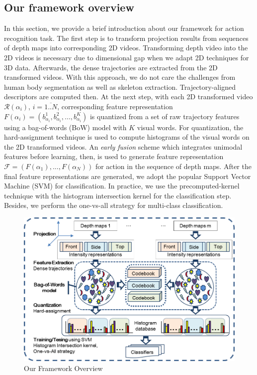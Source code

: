 \documentclass[review]{elsarticle}
\begin{document}
\subsection{Our framework overview}

In this section, we provide a brief introduction about our framework for action recognition task.
The first step is to transform projection results from sequences of depth maps into corresponding 2D videos.
Transforming depth video into the 2D videos is necessary due to dimensional gap when we adapt 2D techniques for 3D data.
Afterwards, the dense trajectories \cite{wang2011densetraj} are extracted from the 2D transformed videos.
With this approach, we do not care the challenges from human body segmentation as well as skeleton extraction.
Trajectory-aligned descriptors are computed then. At the next step, with each 2D transformed video $\mathcal{R}(\alpha_i)$, $i = \overline{1..N}$, corresponding feature representation $F(\alpha_i) = (b^1_\text{$\alpha_i$},b^2_\text{$\alpha_i$},...,b^K_\text{$\alpha_i$})$ is quantized from a set of raw trajectory features using a bag-of-words (BoW) model with $K$ visual words.
For quantization, the hard-assignment technique is used to compute histograms of the visual words on the 2D transformed videos.
An \textit{early fusion} scheme which integrates unimodal features before learning, then, is used to generate feature representation $\mathcal{F} = (F(\alpha_1),...,F(\alpha_N))$ for action in the sequence of depth maps.
After the final feature representations are generated, we adopt the popular Support Vector Machine (SVM) for classification. In practice, we use the precomputed-kernel technique with the histogram intersection kernel for the classification step.
Besides, we perform the one-vs-all strategy for multi-class classification.

\begin{figure}
	\centering
		\includegraphics[width=\textwidth]{Framework3D.png} %
	\caption{\label{lbl:Figure_Framework}Our Framework Overview}
\end{figure}
\end{document}
